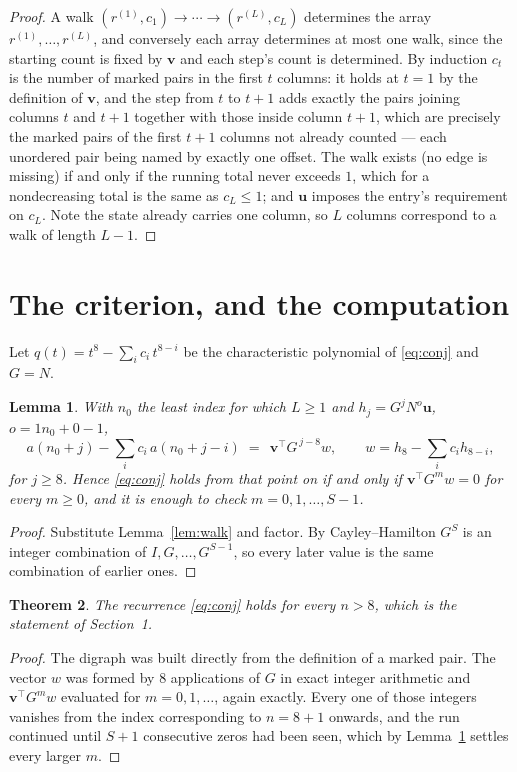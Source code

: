 \documentclass[11pt,a4paper]{article}
\theoremstyle{plain}
\newtheorem{theorem}{Theorem}
\newtheorem{lemma}[theorem]{Lemma}
\theoremstyle{definition}
\begin{document}
\begin{proof}
A walk $(r^{(1)},c_1)\to\cdots\to(r^{(L)},c_L)$ determines the array
$r^{(1)},\dots,r^{(L)}$, and conversely each array determines at most one walk, since the
starting count is fixed by $\mathbf{v}$ and each step's count is determined. By induction
$c_t$ is the number of marked pairs in the first $t$ columns: it holds at $t=1$ by the
definition of $\mathbf{v}$, and the step from $t$ to $t+1$ adds exactly the pairs joining
columns $t$ and $t+1$ together with those inside column $t+1$, which are precisely the marked
pairs of the first $t+1$ columns not already counted --- each unordered pair being named by
exactly one offset. The walk exists (no edge is missing) if and only if the running total
never exceeds $1$, which for a nondecreasing total is the same as $c_L\le1$; and
$\mathbf{u}$ imposes the entry's requirement on $c_L$. Note the state already carries one
column, so $L$ columns correspond to a walk of length $L-1$.
\end{proof}

\section{The criterion, and the computation}

Let $q(t)=t^{8}-\sum_i c_i\,t^{8-i}$ be the characteristic polynomial of
\eqref{eq:conj} and $G=N$.

\begin{lemma}\label{lem:crit}
With $n_0$ the least index for which $L\ge1$ and $h_j=G^{j}N^{o}\mathbf{u}$,
$o=1n_0+0-1$,
\[
a(n_0+j)-\sum_i c_i\,a(n_0+j-i)\;=\;\,\mathbf{v}^{\!\top}G^{\,j-8}w,
\qquad w=h_{8}-\sum_i c_i h_{8-i},
\]
for $j\ge8$. Hence \eqref{eq:conj} holds from that point on if and only if
$\mathbf{v}^{\!\top}G^{m}w=0$ for every $m\ge0$, and it is enough to check
$m=0,1,\dots,S-1$.
\end{lemma}

\begin{proof}
Substitute Lemma~\ref{lem:walk} and factor. By Cayley--Hamilton $G^{S}$ is an integer
combination of $I,G,\dots,G^{S-1}$, so every later value is the same combination of earlier
ones.
\end{proof}

\begin{theorem}
The recurrence \eqref{eq:conj} holds for every $n>8$, which is the statement of
Section~1.
\end{theorem}

\begin{proof}
The digraph was built directly from the definition of a marked pair. The vector $w$ was
formed by $8$ applications of $G$ in exact integer arithmetic and
$\mathbf{v}^{\!\top}G^{m}w$ evaluated for $m=0,1,\dots$, again exactly. Every one of
those integers vanishes from the index corresponding to $n=8+1$ onwards, and the run
continued until $S+1$ consecutive zeros had been seen, which by Lemma~\ref{lem:crit}
settles every larger $m$.
\end{proof}
\end{document}
